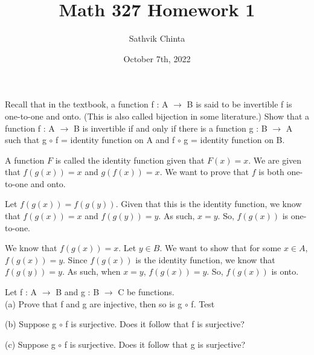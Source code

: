 \documentclass[addpoints]{exam}
\title{Math 327 Homework 1}
\author{Sathvik Chinta}
\date{October 7th, 2022}
\begin{document}
\maketitle

\begin{questions}
\question Recall that in the textbook, a function f : A $\rightarrow$ B is said to be
invertible f is one-to-one and onto. (This is also called bijection in some literature.)
Show that a function f : A $\rightarrow$ B is invertible if and only if there is a function g :
B $\rightarrow$ A such that g $\circ$ f = identity function on A and f $\circ$ g = identity 
function on B.

A function $F$ is called the identity function given that $F(x) = x$. We are given that $f(g(x)) 
= x$ and $g(f(x)) = x$. We want to prove that $f$ is both one-to-one and onto. 

Let $f(g(x)) = f(g(y))$. Given that this is the identity function, we know that $f(g(x)) = x$ 
and $f(g(y)) = y$. As such, $x = y$. So, $f(g(x))$ is one-to-one. 

We know that $f(g(x)) = x$. Let $y \in B$. We want to show that for some $x \in A$, $f(g(x)) = y$.
Since $f(g(x))$ is the identity function, we know that $f(g(y)) = y$. As such, when $x = y$, 
$f(g(x)) = y$. So, $f(g(x))$ is onto.

\question Let f : A $\rightarrow$ B and g : B $\rightarrow$ C be functions.\\
(a) Prove that f and g are injective, then so is g $\circ$ f. Test

(b) Suppose g $\circ$ f is surjective. Does it follow that f is surjective?

(c) Suppose g $\circ$ f is surjective. Does it follow that g is surjective?

\end{questions}
\end{document}
